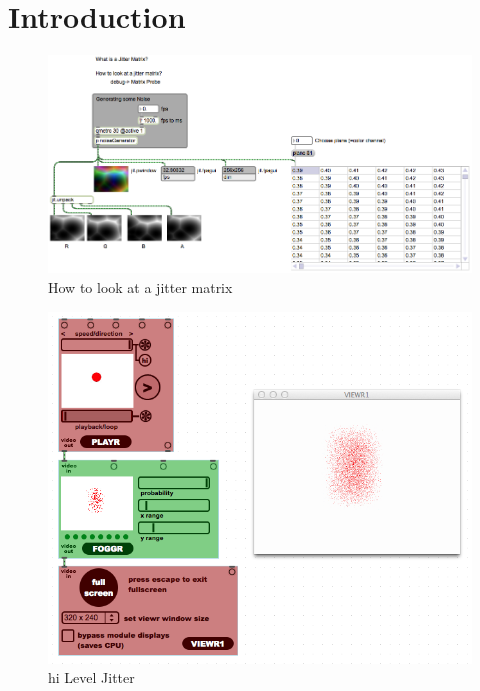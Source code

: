 \section{Introduction}

\begin{figure}[h]
	\begin{center}
		\includegraphics[width = 14cm]{img/lookAtMatrix.png}
		\caption{How to look at a jitter matrix}
		\label{fig:howToLook}
	\end{center}
\end{figure}

\begin{figure}[h]
	\begin{center}
		\includegraphics[width = 14cm]{img/hiLevelJitter.png}
		\caption{hi Level Jitter}
		\label{fig:hiLevelJitter}
	\end{center}
\end{figure}

